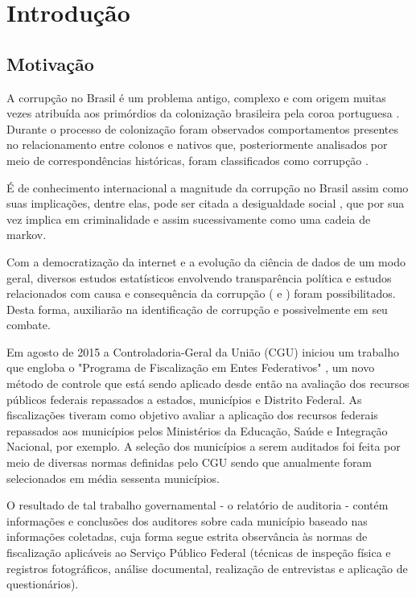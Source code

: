 \chapter{Introdução}
\label{cap:introducao}

\section{Motivação}
\label{sec:motivacao}

A corrupção no Brasil é um problema antigo, complexo e com origem muitas vezes atribuída aos primórdios da colonização brasileira pela coroa portuguesa \citep{LeiteMacedo2017}. Durante o processo de colonização foram observados comportamentos presentes no relacionamento entre colonos e nativos que, posteriormente analisados por meio de correspondências históricas, foram classificados como corrupção \citep{LeiteMacedo2017}.

É de conhecimento internacional a magnitude da corrupção no Brasil assim como suas implicações, dentre elas, pode ser citada a desigualdade social \citep{Alves2018}, que por sua vez implica em criminalidade \citep{ResendeAndrade2018} e assim sucessivamente como uma cadeia de markov.

Com a democratização da internet e a evolução da ciência de dados de um modo geral, diversos estudos estatísticos envolvendo transparência política e estudos relacionados com causa e consequência da corrupção (\citep{FerrazFinan2008} e \citet{Ransom2013:MSc}) foram possibilitados. Desta forma, auxiliarão na identificação de corrupção e possivelmente em seu combate.

Em agosto de 2015 a Controladoria-Geral da União (CGU) iniciou um trabalho que engloba o "Programa de Fiscalização em Entes Federativos" \cite{CGU}, um novo método de controle que está sendo aplicado desde então na avaliação dos recursos públicos federais repassados a estados, municípios e Distrito Federal. As fiscalizações tiveram como objetivo avaliar a aplicação dos recursos federais repassados aos municípios pelos Ministérios da Educação, Saúde e Integração Nacional, por exemplo. A seleção dos municípios a serem auditados foi feita por meio de diversas normas definidas pelo CGU \cite{CGU} sendo que anualmente foram selecionados em média sessenta municípios.

O resultado de tal trabalho governamental - o relatório de auditoria - contém informações e conclusões dos auditores sobre cada município baseado nas informações coletadas, cuja forma segue estrita observância às normas de fiscalização aplicáveis ao Serviço Público Federal (técnicas de inspeção física e registros fotográficos, análise documental, realização de entrevistas e aplicação de questionários).

